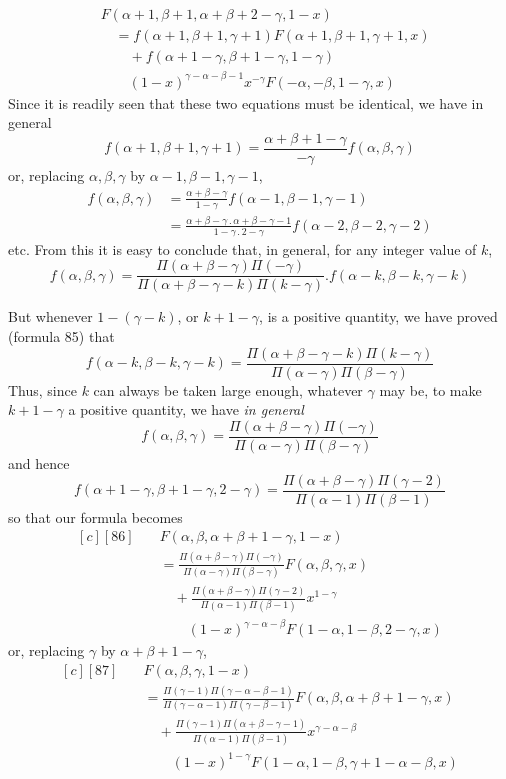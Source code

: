 \[
\begin{aligned}
&F(\alpha+1,\beta+1,\alpha+\beta+2-\gamma,1-x)\\
&\quad=f(\alpha+1,\beta+1,\gamma+1)F(\alpha+1,\beta+1,\gamma+1,x)\\
&\qquad+f(\alpha+1-\gamma,\beta+1-\gamma,1-\gamma)\\&\qquad(1-x)^{\gamma-\alpha-\beta-1}x^{-\gamma}F(-\alpha,-\beta,1-\gamma,x)
\end{aligned}
\]
Since it is readily seen that these two equations must be identical, we have in general
\[
f(\alpha+1,\beta+1,\gamma+1)=\frac{\alpha+\beta+1-\gamma}{-\gamma}f(\alpha,\beta,\gamma)
\]
or, replacing \(\alpha,\beta,\gamma\) by \(\alpha-1,\beta-1,\gamma-1\),
\[
\begin{aligned}
f(\alpha,\beta,\gamma)&=\frac{\alpha+\beta-\gamma}{1-\gamma}f(\alpha-1,\beta-1,\gamma-1)\\
&=\frac{\alpha+\beta-\gamma\,.\,\alpha+\beta-\gamma-1}{1-\gamma\,.\,2-\gamma}f(\alpha-2,\beta-2,\gamma-2)
\end{aligned}
\]
etc. From this it is easy to conclude that, in general, for any integer value of \(k\),
\[
f(\alpha,\beta,\gamma)=\frac{\Pi(\alpha+\beta-\gamma)\Pi(-\gamma)}{\Pi(\alpha+\beta-\gamma-k)\Pi(k-\gamma)}.f(\alpha-k,\beta-k,\gamma-k)
\]
\par{}
But whenever $1-(\gamma-k)$, or $k+1-\gamma$, is a positive quantity, we have proved (formula 85) that
\[
f(\alpha-k,\beta-k,\gamma-k)
=\frac{\Pi(\alpha+\beta-\gamma-k)\Pi(k-\gamma)}{\Pi(\alpha-\gamma)\Pi(\beta-\gamma)}
\]
Thus, since $k$ can always be taken large enough, whatever $\gamma$ may be, to make $k+1-\gamma$ a positive quantity, we have \textit{in general}
\[
f(\alpha,\beta,\gamma)
=\frac{\Pi(\alpha+\beta-\gamma)\Pi(-\gamma)}{\Pi(\alpha-\gamma)\Pi(\beta-\gamma)}
\]
and hence
\[
f(\alpha+1-\gamma,\beta+1-\gamma,2-\gamma)
=\frac{\Pi(\alpha+\beta-\gamma)\Pi(\gamma-2)}{\Pi(\alpha-1)\Pi(\beta-1)}
\]
so that our formula becomes
\[
\begin{aligned}[c]
[86]\quad &F(\alpha,\beta,\alpha+\beta+1-\gamma,1-x)\\
&=\frac{\Pi(\alpha+\beta-\gamma)\Pi(-\gamma)}{\Pi(\alpha-\gamma)\Pi(\beta-\gamma)}F(\alpha,\beta,\gamma,x)\\
&\quad+\frac{\Pi(\alpha+\beta-\gamma)\Pi(\gamma-2)}{\Pi(\alpha-1)\Pi(\beta-1)}x^{1-\gamma}\\&\qquad(1-x)^{\gamma-\alpha-\beta}F(1-\alpha,1-\beta,2-\gamma,x)
\end{aligned}
\]
or, replacing $\gamma$ by $\alpha+\beta+1-\gamma$,
\[
\begin{aligned}[c]
[87]\quad &F(\alpha,\beta,\gamma,1-x)\\
&=\frac{\Pi(\gamma-1)\Pi(\gamma-\alpha-\beta-1)}{\Pi(\gamma-\alpha-1)\Pi(\gamma-\beta-1)}F(\alpha,\beta,\alpha+\beta+1-\gamma,x)\\
&\quad+\frac{\Pi(\gamma-1)\Pi(\alpha+\beta-\gamma-1)}{\Pi(\alpha-1)\Pi(\beta-1)}x^{\gamma-\alpha-\beta}\\&\qquad(1-x)^{1-\gamma}F(1-\alpha,1-\beta,\gamma+1-\alpha-\beta,x)
\end{aligned}
\]

